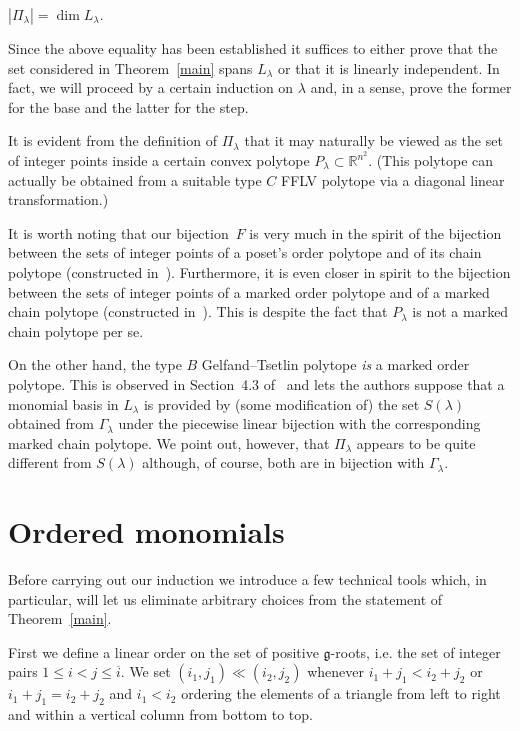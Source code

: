 \documentclass[ALCO,ThmDefs,Unicode]{cedram}
\newcommand{\la}{\lambda}
\begin{document}
\begin{coro}\label{gt}
$|\Pi_\la|=\dim L_\la$.
\end{coro}

Since the above equality has been established it suffices to either prove that the set considered in Theorem~\ref{main} spans $L_\lambda$ or that it is linearly independent. In fact, we will proceed by a certain induction on $\la$ and, in a sense, prove the former for the base and the latter for the step.

\begin{rema}\label{polytope}
It is evident from the definition of $\Pi_\la$ that it may naturally be viewed as the set of integer points inside a certain convex polytope $P_\la\subset\mathbb R^{n^2}$. (This polytope can actually be obtained from a suitable type $C$ FFLV polytope via a diagonal linear transformation.)

It is worth noting that our bijection~$F$ is very much in the spirit of the bijection between the sets of integer points of a poset's order polytope and of its chain polytope (constructed in~\cite{stan}). Furthermore, it is even closer in spirit to the bijection between the sets of integer points of a marked order polytope and of a marked chain polytope (constructed in~\cite{ABS}). This is despite the fact that $P_\la$ is not a marked chain polytope per se.

On the other hand, the type $B$ Gelfand--Tsetlin polytope \emph{is} a marked order polytope. This is observed in Section~4.3 of~\cite{ABS} and lets the authors suppose that a monomial basis in $L_\lambda$ is provided by (some modification of) the set $S(\lambda)$ obtained from $\Gamma_\lambda$ under the piecewise linear bijection with the corresponding marked chain polytope. We point out, however, that $\Pi_\lambda$ appears to be quite different from $S(\lambda)$ although, of course, both are in bijection with $\Gamma_\lambda$.
\end{rema}


\section{Ordered monomials}\label{ordmon}

Before carrying out our induction we introduce a few technical tools which, in particular, will let us eliminate arbitrary choices from the statement of Theorem~\ref{main}.

First we define a linear order on the set of positive $\mathfrak g$-roots, i.e. the set of integer pairs $1\le i<j \le\overline i$. We set $(i_1,j_1)\ll(i_2,j_2)$ whenever $i_1+j_1<i_2+j_2$ or $i_1+j_1=i_2+j_2$ and $i_1<i_2$ ordering the elements of a triangle from left to right and within a vertical column from bottom to top.
\end{document}
